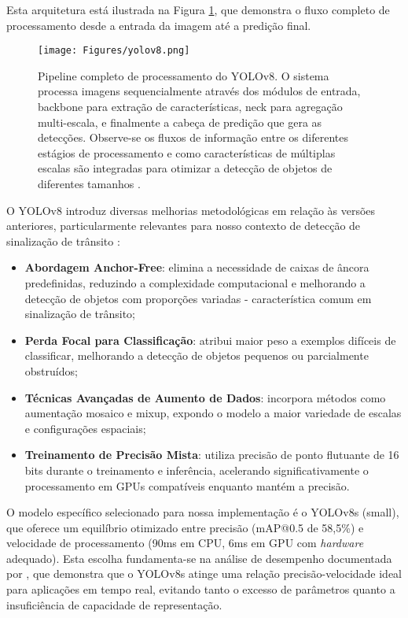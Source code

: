 Esta arquitetura está ilustrada na Figura \ref{yolo_detection}, que demonstra o fluxo completo de processamento desde a entrada da imagem até a predição final.

\begin{figure}[H]
\centering
\texttt{[image: Figures/yolov8.png]}
\caption{Pipeline completo de processamento do YOLOv8. O sistema processa imagens sequencialmente através dos módulos de entrada, backbone para extração de características, neck para agregação multi-escala, e finalmente a cabeça de predição que gera as detecções. Observe-se os fluxos de informação entre os diferentes estágios de processamento e como características de múltiplas escalas são integradas para otimizar a detecção de objetos de diferentes tamanhos \cite[p.~2]{yaseen2024yolov8indepthexplorationinternal}.}
\label{yolo_detection}
\end{figure}

O YOLOv8 introduz diversas melhorias metodológicas em relação às versões anteriores, particularmente relevantes para nosso contexto de detecção de sinalização de trânsito \cite{yaseen2024yolov8indepthexplorationinternal}:

\begin{itemize}
    \item \textbf{Abordagem Anchor-Free}: elimina a necessidade de caixas de âncora predefinidas, reduzindo a complexidade computacional e melhorando a detecção de objetos com proporções variadas - característica comum em sinalização de trânsito;
    
    \item \textbf{Perda Focal para Classificação}: atribui maior peso a exemplos difíceis de classificar, melhorando a detecção de objetos pequenos ou parcialmente obstruídos;
    
    \item \textbf{Técnicas Avançadas de Aumento de Dados}: incorpora métodos como aumentação mosaico e mixup, expondo o modelo a maior variedade de escalas e configurações espaciais;
    
    \item \textbf{Treinamento de Precisão Mista}: utiliza precisão de ponto flutuante de 16 bits durante o treinamento e inferência, acelerando significativamente o processamento em GPUs compatíveis enquanto mantém a precisão.
\end{itemize}

O modelo específico selecionado para nossa implementação é o YOLOv8s (small), que oferece um equilíbrio otimizado entre precisão (mAP@0.5 de 58,5\%) e velocidade de processamento (90ms em CPU, 6ms em GPU com \textit{hardware} adequado). Esta escolha fundamenta-se na análise de desempenho documentada por , que demonstra que o YOLOv8s atinge uma relação precisão-velocidade ideal para aplicações em tempo real, evitando tanto o excesso de parâmetros quanto a insuficiência de capacidade de representação.

